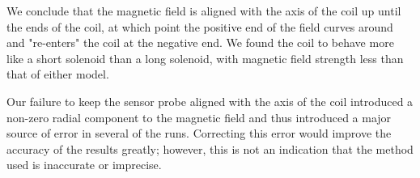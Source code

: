 We conclude that the magnetic field is aligned with the axis of the coil up until the ends of the coil, at which point the positive end of the field curves around and "re-enters" the coil at the negative end. We found the coil to behave more like a short solenoid than a long solenoid, with magnetic field strength less than that of either model.

\bigskip
Our failure to keep the sensor probe aligned with the axis of the coil introduced a non-zero radial component to the magnetic field and thus introduced a major source of error in several of the runs. Correcting this error would improve the accuracy of the results greatly; however, this is not an indication that the method used is inaccurate or imprecise.
